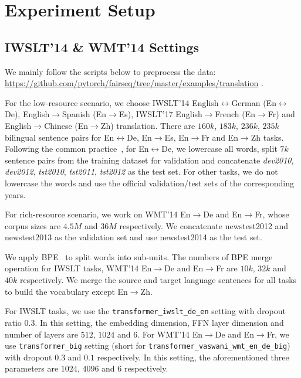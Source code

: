 \documentclass{article} \usepackage{iclr2020_conference,times}
\begin{document}



\clearpage
\appendix
\section{Experiment Setup}

\subsection{IWSLT'14 \& WMT'14 Settings}\label{sec:iwslt_wmt_data}

We mainly follow the scripts below to preprocess the data:
{{\small
\url{https://github.com/pytorch/fairseq/tree/master/examples/translation} 
}}.


 For the low-resource scenario, we choose IWSLT'14 English$\leftrightarrow$German (En$\leftrightarrow$De), English$\to$Spanish (En$\to$Es), IWSLT'17 English$\to$French (En$\to$Fr) and English$\to$Chinese (En$\to$Zh) translation. There are $160k$, $183k$, $236k$, $235k$ bilingual sentence pairs for En$\leftrightarrow$De, En$\to$Es, En$\to$Fr and En$\to$Zh tasks. Following the common practice~\citep{edunov2018classical}, for En$\leftrightarrow$De, we lowercase all words, split $7k$ sentence pairs from the training dataset for validation and concatenate \textit{dev2010}, \textit{dev2012}, \textit{tst2010}, \textit{tst2011}, \textit{tst2012} as the test set. For other tasks, we do not lowercase the words and use the official validation/test sets of the corresponding years. 

For rich-resource scenario, we work on WMT'14 En$\to$De and En$\to$Fr, whose corpus sizes are $4.5M$ and $36M$ respectively. We concatenate newstest2012 and newstest2013 as the validation set and use newstest2014 as the test set. 

We apply BPE~\citep{sennrich2016neural} to split words into sub-units. The numbers of BPE merge operation for IWSLT tasks, WMT'14 En$\to$De and En$\to$Fr are $10k$, $32k$ and $40k$ respectively. We merge the source and target language sentences for all tasks to build the vocabulary except En$\to$Zh. 

 For IWSLT tasks, we use the \texttt{transformer\_iwslt\_de\_en} setting with dropout ratio $0.3$. In this setting, the embedding dimension, FFN layer dimension and number of layers are $512$, $1024$ and $6$. For WMT'14 En$\to$De and En$\to$Fr, we use \texttt{transformer\_big} setting (short for \texttt{transformer\_vaswani\_wmt\_en\_de\_big}) with dropout $0.3$ and $0.1$ respectively. In this setting, the aforementioned three parameters are $1024$, $4096$ and $6$ respectively. 
\end{document}
